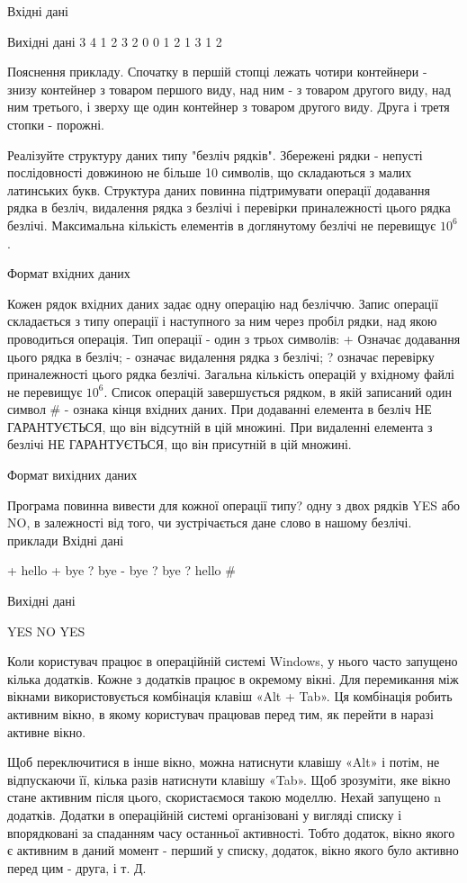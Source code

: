 \documentclass[]{article}
\begin{document}
\begin{enumerate}
Вхідні дані


Вихідні дані
3
4 1 2 3 2
0
0 1 2
1 3
1 2

Пояснення прикладу. Спочатку в першій стопці лежать чотири контейнери - знизу контейнер з товаром першого виду, над ним - з товаром другого виду, над ним третього, і зверху ще один контейнер з товаром другого виду. Друга і третя стопки - порожні.

Реалізуйте структуру даних типу "безліч рядків". Збережені рядки - непусті послідовності довжиною не більше 10 символів, що складаються з малих латинських букв.
Структура даних повинна підтримувати операції додавання рядка в безліч, видалення рядка з безлічі і перевірки приналежності цього рядка безлічі.
Максимальна кількість елементів в доглянутому безлічі не перевищує $10^6$.

Формат вхідних даних

Кожен рядок вхідних даних задає одну операцію над безліччю. Запис операції складається з типу операції і наступного за ним через пробіл рядки, над якою проводиться операція.
Тип операції - один з трьох символів:
    + Означає додавання цього рядка в безліч;
    - означає видалення рядка з безлічі;
    ? означає перевірку приналежності цього рядка безлічі.
Загальна кількість операцій у вхідному файлі не перевищує $10^6$. Список операцій завершується рядком, в якій записаний один символ 
\# - ознака кінця вхідних даних.
При додаванні елемента в безліч НЕ ГАРАНТУЄТЬСЯ, що він відсутній в цій множині. При видаленні елемента з безлічі НЕ ГАРАНТУЄТЬСЯ, що він присутній в цій множині.

Формат вихідних даних

Програма повинна вивести для кожної операції типу? одну з двох рядків YES або NO, в залежності від того, чи зустрічається дане слово в нашому безлічі.
приклади
Вхідні дані

+ hello
+ bye
? bye
- bye
? bye
? hello
\#

Вихідні дані

YES
NO
YES


Коли користувач працює в операційній системі Windows, у нього часто запущено кілька додатків. Кожне з додатків працює в окремому вікні. Для перемикання між вікнами використовується комбінація клавіш «Alt + Tab». Ця комбінація робить активним вікно, в якому користувач працював перед тим, як перейти в наразі активне вікно.

Щоб переключитися в інше вікно, можна натиснути клавішу «Alt» і потім, не відпускаючи її, кілька разів натиснути клавішу «Tab». Щоб зрозуміти, яке вікно стане активним після цього, скористаємося такою моделлю. Нехай запущено n додатків. Додатки в операційній системі організовані у вигляді списку і впорядковані за спаданням часу останньої активності. Тобто додаток, вікно якого є активним в даний момент - перший у списку, додаток, вікно якого було активно перед цим - друга, і т. Д.


\end{enumerate}
\end{document}
